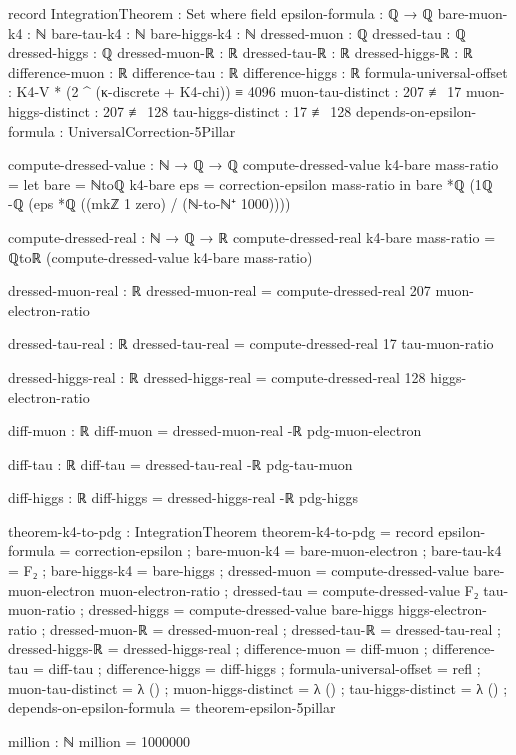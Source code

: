 \documentclass[11pt,a4paper]{book}
\begin{document}
\begin{code}
record IntegrationTheorem : Set where
  field
    epsilon-formula : ℚ → ℚ
    bare-muon-k4 : ℕ
    bare-tau-k4 : ℕ  
    bare-higgs-k4 : ℕ
    dressed-muon : ℚ
    dressed-tau : ℚ
    dressed-higgs : ℚ
    dressed-muon-ℝ : ℝ
    dressed-tau-ℝ : ℝ
    dressed-higgs-ℝ : ℝ
    difference-muon : ℝ
    difference-tau : ℝ
    difference-higgs : ℝ
    formula-universal-offset : K4-V * (2 ^ (κ-discrete + K4-chi)) ≡ 4096
    muon-tau-distinct : 207 ≢ 17
    muon-higgs-distinct : 207 ≢ 128
    tau-higgs-distinct : 17 ≢ 128
    depends-on-epsilon-formula : UniversalCorrection-5Pillar

compute-dressed-value : ℕ → ℚ → ℚ
compute-dressed-value k4-bare mass-ratio = 
  let bare = ℕtoℚ k4-bare
      eps = correction-epsilon mass-ratio
  in bare *ℚ (1ℚ -ℚ (eps *ℚ ((mkℤ 1 zero) / (ℕ-to-ℕ⁺ 1000))))

compute-dressed-real : ℕ → ℚ → ℝ
compute-dressed-real k4-bare mass-ratio = ℚtoℝ (compute-dressed-value k4-bare mass-ratio)

dressed-muon-real : ℝ
dressed-muon-real = compute-dressed-real 207 muon-electron-ratio

dressed-tau-real : ℝ
dressed-tau-real = compute-dressed-real 17 tau-muon-ratio

dressed-higgs-real : ℝ
dressed-higgs-real = compute-dressed-real 128 higgs-electron-ratio

diff-muon : ℝ
diff-muon = dressed-muon-real -ℝ pdg-muon-electron

diff-tau : ℝ
diff-tau = dressed-tau-real -ℝ pdg-tau-muon

diff-higgs : ℝ
diff-higgs = dressed-higgs-real -ℝ pdg-higgs

theorem-k4-to-pdg : IntegrationTheorem
theorem-k4-to-pdg = record
  { epsilon-formula = correction-epsilon
  ; bare-muon-k4 = bare-muon-electron
  ; bare-tau-k4 = F₂
  ; bare-higgs-k4 = bare-higgs
  ; dressed-muon = compute-dressed-value bare-muon-electron muon-electron-ratio
  ; dressed-tau = compute-dressed-value F₂ tau-muon-ratio
  ; dressed-higgs = compute-dressed-value bare-higgs higgs-electron-ratio
  ; dressed-muon-ℝ = dressed-muon-real
  ; dressed-tau-ℝ = dressed-tau-real
  ; dressed-higgs-ℝ = dressed-higgs-real
  ; difference-muon = diff-muon
  ; difference-tau = diff-tau
  ; difference-higgs = diff-higgs
  ; formula-universal-offset = refl
  ; muon-tau-distinct = λ ()
  ; muon-higgs-distinct = λ ()
  ; tau-higgs-distinct = λ ()
  ; depends-on-epsilon-formula = theorem-epsilon-5pillar
  }

million : ℕ
million = 1000000


\end{code}
\end{document}
